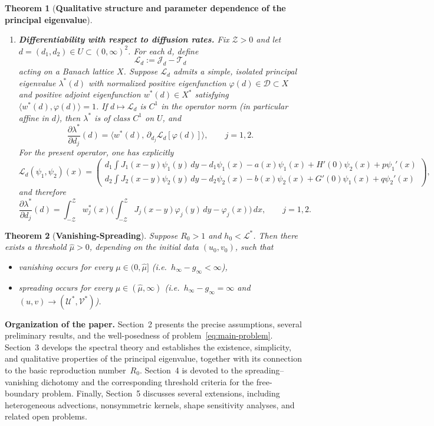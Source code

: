 \documentclass[a4paper,11pt]{amsart}
\newtheorem{theorem}{Theorem}
\theoremstyle{definition}
\numberwithin{equation}{section}
\theoremstyle{definition}
\begin{document}
\begin{theorem}[\textbf{Qualitative structure and parameter dependence of the principal eigenvalue}]
\begin{enumerate}[label=(\roman*),wide,labelwidth=!,labelindent=0pt]
\medskip
\item \textbf{Differentiability with respect to diffusion rates.}
Fix $\mathcal Z>0$ and let $d=(d_1,d_2)\in U\subset(0,\infty)^2$.
For each $d$, define
\[
\mathcal L_d:=\mathscr J_d-\mathscr T_d
\]
acting on a Banach lattice $X$. Suppose $\mathcal L_d$ admits a simple, isolated principal eigenvalue $\lambda^\ast(d)$ with normalized positive eigenfunction $\varphi(d)\in\mathcal D\subset X$ and positive adjoint eigenfunction $w^*(d)\in X^*$ satisfying
$\langle w^*(d),\varphi(d)\rangle=1$.
If $d\mapsto\mathcal L_d$ is $C^1$ in the operator norm (in particular affine in $d$), then $\lambda^\ast$ is of class $C^1$ on $U$, and
\[
\frac{\partial\lambda^\ast}{\partial d_j}(d)
=\big\langle w^*(d),\,\partial_{d_j}\mathcal L_d[\varphi(d)]\big\rangle,
\qquad j=1,2.
\]
For the present operator, one has explicitly
\[
\mathcal L_d(\psi_1,\psi_2)(x)
=\begin{pmatrix}
d_1\!\displaystyle\int J_1(x-y)\psi_1(y)\,dy - d_1\psi_1(x) - a(x)\psi_1(x) + H'(0)\psi_2(x) + p\psi_1'(x)\\[6pt]
d_2\!\displaystyle\int J_2(x-y)\psi_2(y)\,dy - d_2\psi_2(x) - b(x)\psi_2(x) + G'(0)\psi_1(x) + q\psi_2'(x)
\end{pmatrix},
\]
and therefore
\[
\frac{\partial\lambda^\ast}{\partial d_j}(d)
= \int_{-\mathcal Z}^{\mathcal Z} w_j^*(x)
\Big(\int_{-\mathcal Z}^{\mathcal Z}J_j(x-y)\varphi_j(y)\,dy - \varphi_j(x)\Big)\,dx,
\qquad j=1,2.
\]
\end{enumerate}
\end{theorem}




\begin{theorem}[\textbf{Vanishing-Spreading}]\label{thm:threshold-mu}
Suppose $R_0>1$ and $h_0<\mathcal L^\ast$. Then there exists a threshold $\hat\mu>0$, depending on the initial data $(u_0,v_0)$, such that
\begin{itemize}
  \item vanishing occurs for every $\mu\in(0,\hat{\mu}]$ (i.e.\ $h_\infty-g_\infty<\infty$),
  \item spreading occurs for every $\mu\in(\hat{\mu},\infty)$ (i.e.\ $h_\infty-g_\infty=\infty$ and $(u,v)\to(\mathscr U^\ast,\mathscr V^\ast)$).
\end{itemize}
\end{theorem}


\medskip
\noindent\textbf{Organization of the paper. }
Section~2 presents the precise assumptions, several preliminary results, and the well-posedness of problem~\eqref{eq:main-problem}.
Section~3 develops the spectral theory and establishes the existence, simplicity, and qualitative properties of the principal eigenvalue, together with its connection to the basic reproduction number~$R_0$. Section~4 is devoted to the spreading–vanishing dichotomy and the corresponding threshold criteria for the free-boundary problem. Finally, Section~5 discusses several extensions, including heterogeneous advections, nonsymmetric kernels, shape sensitivity analyses, and related open problems.
\end{document}
